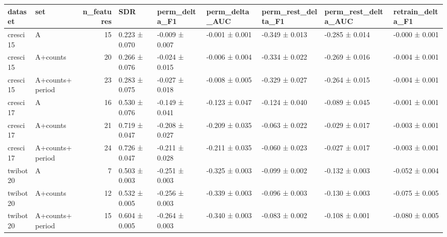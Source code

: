 \begin{tabular}{llrllllll}
\toprule
dataset & set & n_features & SDR & perm_delta_F1 & perm_delta_AUC & perm_rest_delta_F1 & perm_rest_delta_AUC & retrain_delta_F1 \\
\midrule
cresci15 & A & 15 & 0.223 ± 0.070 & -0.009 ± 0.007 & -0.001 ± 0.001 & -0.349 ± 0.013 & -0.285 ± 0.014 & -0.000 ± 0.001 \\
cresci15 & A+counts & 20 & 0.266 ± 0.076 & -0.024 ± 0.015 & -0.006 ± 0.004 & -0.334 ± 0.022 & -0.269 ± 0.016 & -0.004 ± 0.001 \\
cresci15 & A+counts+period & 23 & 0.283 ± 0.075 & -0.027 ± 0.018 & -0.008 ± 0.005 & -0.329 ± 0.027 & -0.264 ± 0.015 & -0.004 ± 0.001 \\
cresci17 & A & 16 & 0.530 ± 0.076 & -0.149 ± 0.041 & -0.123 ± 0.047 & -0.124 ± 0.040 & -0.089 ± 0.045 & -0.001 ± 0.001 \\
cresci17 & A+counts & 21 & 0.719 ± 0.047 & -0.208 ± 0.027 & -0.209 ± 0.035 & -0.063 ± 0.022 & -0.029 ± 0.017 & -0.003 ± 0.001 \\
cresci17 & A+counts+period & 24 & 0.726 ± 0.047 & -0.211 ± 0.028 & -0.211 ± 0.035 & -0.060 ± 0.023 & -0.027 ± 0.017 & -0.003 ± 0.001 \\
twibot20 & A & 7 & 0.503 ± 0.003 & -0.251 ± 0.003 & -0.325 ± 0.003 & -0.099 ± 0.002 & -0.132 ± 0.003 & -0.052 ± 0.004 \\
twibot20 & A+counts & 12 & 0.532 ± 0.005 & -0.256 ± 0.003 & -0.339 ± 0.003 & -0.096 ± 0.003 & -0.130 ± 0.003 & -0.075 ± 0.005 \\
twibot20 & A+counts+period & 15 & 0.604 ± 0.005 & -0.264 ± 0.003 & -0.340 ± 0.003 & -0.083 ± 0.002 & -0.108 ± 0.001 & -0.080 ± 0.005 \\
\bottomrule
\end{tabular}
